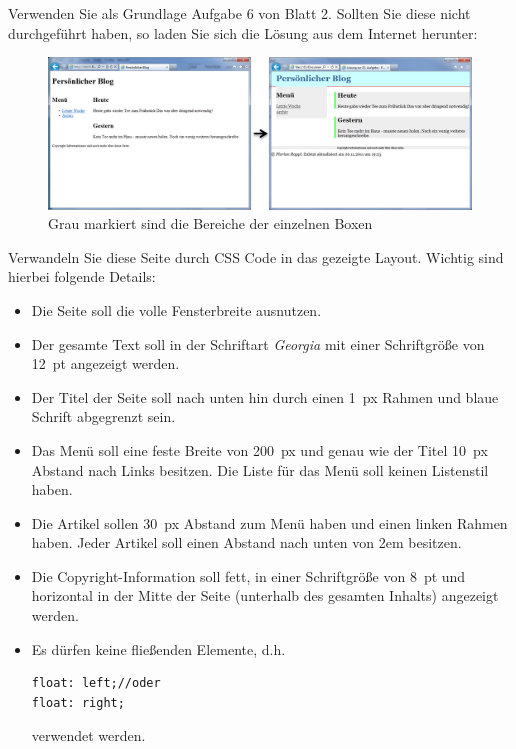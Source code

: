 %
\par Verwenden Sie als Grundlage Aufgabe 6 von Blatt 2. Sollten Sie diese nicht durchgeführt haben, so laden Sie sich die Lösung aus dem Internet herunter:
%
\begin{figure}[!h]
\centering
\includegraphics[width=1\textwidth]{Figures/applycss.png}
\caption{Grau markiert sind die Bereiche der einzelnen Boxen}
\label{fig:applycss}
\end{figure}
%
\par Verwandeln Sie diese Seite durch CSS Code in das gezeigte Layout. Wichtig sind hierbei folgende Details:
%
\begin{itemize}
\item Die Seite soll die volle Fensterbreite ausnutzen.
\item Der gesamte Text soll in der Schriftart \emph{Georgia} mit einer Schriftgröße von \qty{12}{pt} angezeigt werden.
\item Der Titel der Seite soll nach unten hin durch einen \qty{1}{px} Rahmen und blaue Schrift abgegrenzt sein.
\item Das Menü soll eine feste Breite von \qty{200}{px} und genau wie der Titel \qty{10}{px} Abstand nach Links besitzen. Die Liste für das Menü soll keinen Listenstil haben.
\item Die Artikel sollen \qty{30}{px} Abstand zum Menü haben und einen linken Rahmen haben. Jeder Artikel soll einen Abstand nach unten von 2em besitzen.
\item Die Copyright-Information soll fett, in einer Schriftgröße von \qty{8}{pt} und horizontal in der Mitte der Seite (unterhalb des gesamten Inhalts) angezeigt werden. 
\item Es dürfen keine fließenden Elemente, d.h.
%
\begin{lstlisting}
float: left;//oder
float: right;
\end{lstlisting}
%
verwendet werden.
\end{itemize}